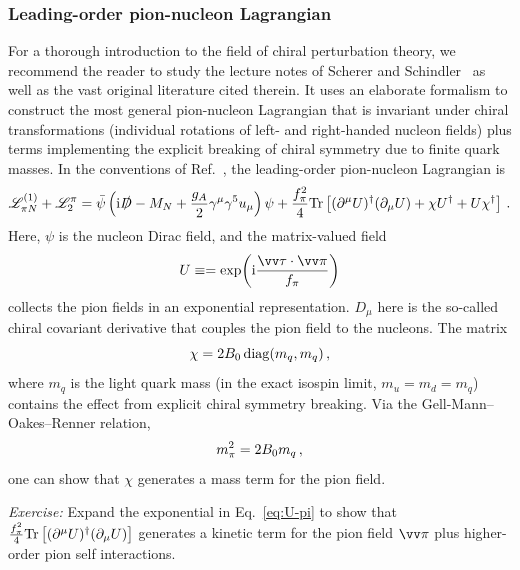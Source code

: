 \subsubsection{Leading-order pion-nucleon Lagrangian}

For a thorough introduction to the field of chiral perturbation theory, we 
recommend the reader to study the lecture notes of Scherer and 
Schindler~\cite{Scherer:2012xha} as well as the vast original literature cited 
therein.  It uses an elaborate formalism to construct the most general 
pion-nucleon Lagrangian that is invariant under chiral transformations 
(individual rotations of left- and right-handed nucleon fields) plus terms 
implementing the explicit breaking of chiral symmetry due to finite quark 
masses.  In the conventions of Ref.~\cite{Scherer:2012xha}, the leading-order 
pion-nucleon Lagrangian is
%
\begin{equation}
 \LL_{\pi N}^{(1)} + \LL_2^\pi
 = \bar{\psi}\left(\ii\slashed{D} - \MN
 +\frac{g_A}{2}\gamma^\mu\gamma^5 u_\mu\right)\psi
 + \frac{\fpi^2}{4}\Tr\left[(\partial^\mu U)^\dagger (\partial_\mu U)
 + \chi U^\dagger + U \chi^\dagger\right] \,.
\label{eq:L-pi-N-chiral}
\end{equation}
%
Here, $\psi$ is the nucleon Dirac field, and the matrix-valued field
%
\begin{equation}
 U \equiv = \exp\!\left(\ii\frac{\skvec{\tau}\cdot\skvec{\pi}}{\fpi}\right)
\label{eq:U-pi}
\end{equation}
%
collects the pion fields in an exponential representation.  $D_\mu$ here is the 
so-called chiral covariant derivative that couples the pion field to the 
nucleons.  The matrix
%
\begin{equation}
 \chi = 2 B_0 \, \mathrm{diag}(m_q,m_q) \,,
\end{equation}
%
where $m_q$ is the light quark mass (in the exact isospin limit, $m_u=m_d=m_q$) 
contains the effect from explicit chiral symmetry breaking.  Via the 
Gell-Mann--Oakes--Renner relation,
%
\begin{equation}
 \mpi^2 = 2B_0 m_q \,,
\label{eq:GMOR}
\end{equation}
%
one can show that $\chi$ generates a mass term for the pion field.

\begin{prob}
\emph{Exercise:} Expand the exponential in Eq.~\eqref{eq:U-pi} to show that 
$\frac{f_\pi^2}{4} \mathrm{Tr}\left[(\partial^\mu U)^\dagger (\partial_\mu U)\right]$ 
generates a kinetic term for the pion field $\skvec{\pi}$ plus higher-order 
pion self interactions.
\end{prob}

